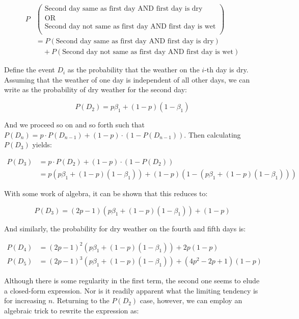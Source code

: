 \documentclass[10pt, oneside]{article}
\begin{document}
\begin{enumerate}[label=3.\arabic*]
   \begin{align*}
   P &\begin{pmatrix} %
      \text{Second day same as first day AND first day is dry}  \\
      \text{OR}  \\
      \text{Second day not same as first day AND first day is wet} \\
   \end{pmatrix} \\
   &= P(\text{Second day same as first day AND first day is dry}) \\
   &\quad + P( \text{Second day not same as first day AND first day is wet})
   \end{align*}
   
   Define the event $D_i$ as the probability that the weather on the $i$-th day is dry. Assuming that the weather of one day is independent of all other days, we can write as the probability of dry weather for the second day:
   
   \[ P(D_2) = p \beta_1 + (1-p)(1 - \beta_1) \]
   
   And we proceed so on and so forth such that $P(D_{n}) = p \cdot P(D_{n-1}) + (1-p) \cdot (1 - P(D_{n-1}))$. Then calculating $P(D_3)$ yields:
   
   \begin{align*}
   P(D_{3}) &= p \cdot P(D_{2}) + (1-p) \cdot (1 - P(D_{2})) \\
   &= p(p \beta_1 + (1-p)(1 - \beta_1)) + (1-p) (1 - (p \beta_1 + (1-p)(1 - \beta_1)))
   \end{align*}
   
   With some work of algebra, it can be shown that this reduces to:
   
   \[ P(D_3) = (2p-1)(p \beta_1 + (1-p)(1 - \beta_1)) + (1-p) \]
   
   And similarly, the probability for dry weather on the fourth and fifth days is:
   
   \begin{align*}
   P(D_4) &= (2p-1)^2 (p \beta_1 + (1-p)(1 - \beta_1)) + 2p(1-p) \\
   P(D_5) &= (2p-1)^3 (p \beta_1 + (1-p)(1 - \beta_1)) + (4p^2 - 2p + 1)(1-p)
   \end{align*}
   
   Although there is some regularity in the first term, the second one seems to elude a closed-form expression. Nor is it readily apparent what the limiting tendency is for increasing $n$. Returning to the $P(D_2)$ case, however, we can employ an algebraic trick to rewrite the expression as:
   

\end{enumerate}
\end{document}
